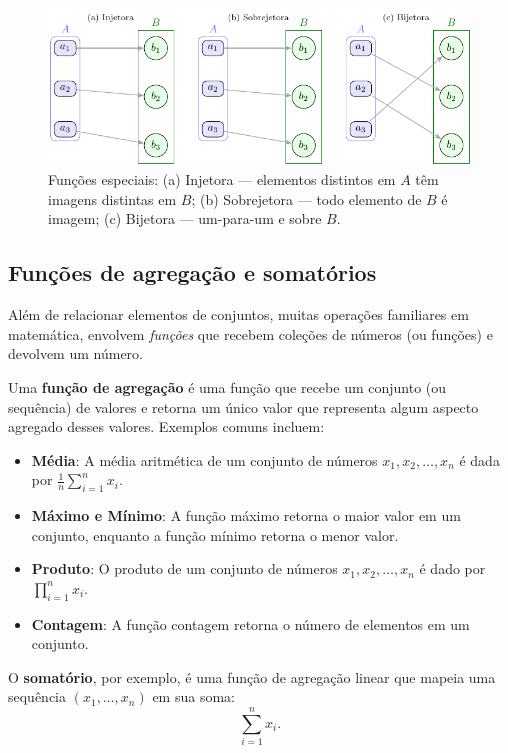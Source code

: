 \begin{figure}[H]
	\centering
	\includegraphics[width=0.9\linewidth]{figures/fig_inj_sobre_bij.pdf}

	\caption{Funções especiais: (a) Injetora — elementos distintos em $A$ têm imagens distintas em $B$; (b) Sobrejetora — todo elemento de $B$ é imagem; (c) Bijetora — um-para-um e sobre $B$.}
	\label{fig:inj-sobre-bij}\end{figure}


\subsection{Funções de agregação e somatórios}


Além de relacionar elementos de conjuntos, muitas operações familiares em matemática, envolvem \emph{funções} que recebem coleções de números (ou funções) e devolvem um número.


Uma \textbf{função de agregação} é uma função que recebe um conjunto (ou sequência) de valores e retorna um único valor que representa algum aspecto agregado desses valores. Exemplos comuns incluem:
\begin{itemize}
	\item \textbf{Média}: A média aritmética de um conjunto de números \(x_1, x_2, \ldots, x_n\) é dada por \(\frac{1}{n}\sum_{i=1}^{n} x_i\).
	\item \textbf{Máximo e Mínimo}: A função máximo retorna o maior valor em um conjunto, enquanto a função mínimo retorna o menor valor.
	\item \textbf{Produto}: O produto de um conjunto de números \(x_1, x_2, \ldots, x_n\) é dado por \(\prod_{i=1}^{n} x_i\).
	\item \textbf{Contagem}: A função contagem retorna o número de elementos em um conjunto.
\end{itemize}

O \textbf{somatório}, por exemplo, é uma função de agregação linear que mapeia uma sequência \((x_1,\dots,x_n)\) em sua soma:
\[\sum_{i=1}^{n} x_i.\]

